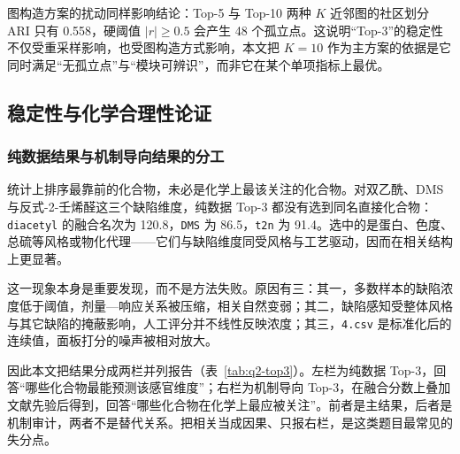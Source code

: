 ﻿\documentclass[UTF8,a4paper,zihao=-4]{ctexart}
\numberwithin{figure}{section}
\numberwithin{table}{section}
\numberwithin{equation}{section}
\newcommand{\file}[1]{\texttt{#1}}
\begin{document}
图构造方案的扰动同样影响结论：Top-5 与 Top-10 两种 $K$ 近邻图的社区划分 ARI 只有 0.558，硬阈值 $|r|\ge0.5$ 会产生 48 个孤立点。这说明“Top-3”的稳定性不仅受重采样影响，也受图构造方式影响，本文把 $K=10$ 作为主方案的依据是它同时满足“无孤立点”与“模块可辨识”，而非它在某个单项指标上最优。

\subsection{稳定性与化学合理性论证}

\subsubsection{纯数据结果与机制导向结果的分工}

统计上排序最靠前的化合物，未必是化学上最该关注的化合物。对双乙酰、DMS 与反式-2-壬烯醛这三个缺陷维度，纯数据 Top-3 都没有选到同名直接化合物：\file{diacetyl} 的融合名次为 120.8，\file{DMS} 为 86.5，\file{t2n} 为 91.4。选中的是蛋白、色度、总硫等风格或物化代理——它们与缺陷维度同受风格与工艺驱动，因而在相关结构上更显著。

这一现象本身是重要发现，而不是方法失败。原因有三：其一，多数样本的缺陷浓度低于阈值，剂量—响应关系被压缩，相关自然变弱；其二，缺陷感知受整体风格与其它缺陷的掩蔽影响，人工评分并不线性反映浓度；其三，\file{4.csv} 是标准化后的连续值，面板打分的噪声被相对放大。

因此本文把结果分成两栏并列报告（表~\ref{tab:q2-top3}）。左栏为纯数据 Top-3，回答“哪些化合物最能预测该感官维度”；右栏为机制导向 Top-3，在融合分数上叠加文献先验后得到，回答“哪些化合物在化学上最应被关注”。前者是主结果，后者是机制审计，两者不是替代关系。把相关当成因果、只报右栏，是这类题目最常见的失分点。
\end{document}
